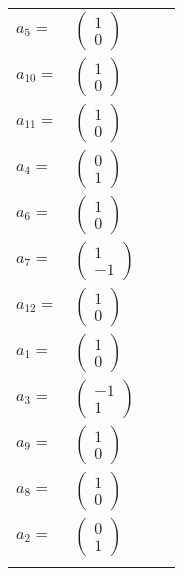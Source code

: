 \documentclass[1p]{elsarticle_modified}
\theoremstyle{definition}
\begin{document}
\begin{tabular}{m{7pt} m{180pt} m{7pt} m{180pt} }
\flushright $a_{5}=$&$\begin{pmatrix}1\\0\end{pmatrix}$ \\
\flushright $a_{10}=$&$\begin{pmatrix}1\\0\end{pmatrix}$ \\
\flushright $a_{11}=$&$\begin{pmatrix}1\\0\end{pmatrix}$ \\
\flushright $a_{4}=$&$\begin{pmatrix}0\\1\end{pmatrix}$ \\
\flushright $a_{6}=$&$\begin{pmatrix}1\\0\end{pmatrix}$ \\
\flushright $a_{7}=$&$\begin{pmatrix}1\\-1\end{pmatrix}$ \\
\flushright $a_{12}=$&$\begin{pmatrix}1\\0\end{pmatrix}$ \\
\flushright $a_{1}=$&$\begin{pmatrix}1\\0\end{pmatrix}$ \\
\flushright $a_{3}=$&$\begin{pmatrix}-1\\1\end{pmatrix}$ \\
\flushright $a_{9}=$&$\begin{pmatrix}1\\0\end{pmatrix}$ \\
\flushright $a_{8}=$&$\begin{pmatrix}1\\0\end{pmatrix}$ \\
\flushright $a_{2}=$&$\begin{pmatrix}0\\1\end{pmatrix}$\\&\end{tabular}
\end{document}
